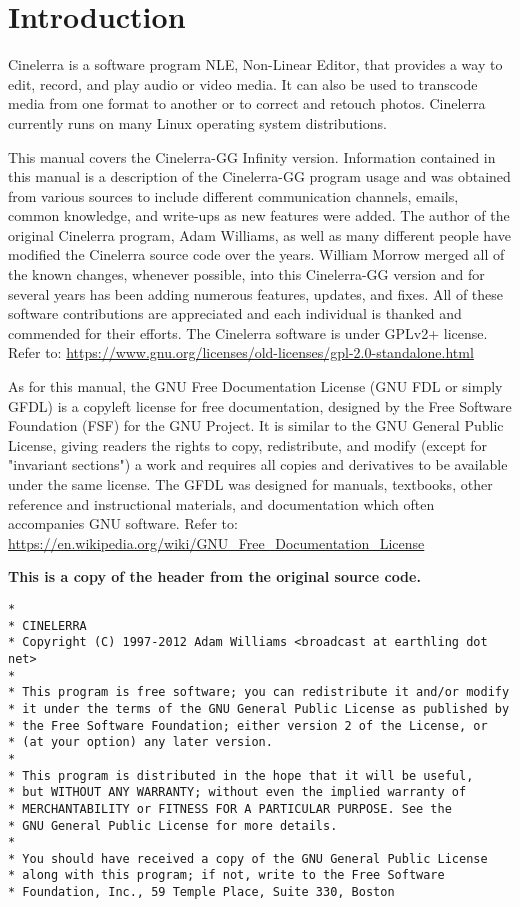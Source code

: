 \chapter*{Introduction}%
\label{cha:introduction}

Cinelerra is a software program NLE, Non-Linear Editor, that provides a way to edit, record, and play audio or video media. 
It can also be used to transcode media from one format to another or to correct and retouch photos. Cinelerra 
currently runs on many Linux operating system distributions.

This manual covers the Cinelerra-GG Infinity version. 
Information contained in this manual is a description of the Cinelerra-GG program usage and was obtained from
various sources to include different communication channels, emails, common knowledge, and write-ups as new features were added.  
The author of the original Cinelerra program, Adam Williams, as well as many different people have modified
 the Cinelerra source code over the years. 
William Morrow merged all of the known changes, whenever possible, into this Cinelerra-GG version and for several years has been adding numerous features, updates, and fixes. 
All of these software contributions are appreciated and each individual is thanked and commended for their efforts.
The Cinelerra software is under GPLv2+ license. 
Refer to: {\small\url{https://www.gnu.org/licenses/old-licenses/gpl-2.0-standalone.html}}

As for this manual, the GNU Free Documentation License (GNU FDL or simply GFDL) is a copyleft
license for free documentation, designed by the Free Software Foundation (FSF) for the GNU
Project. It is similar to the GNU General Public License, giving readers the rights to copy,
redistribute, and modify (except for "invariant sections") a work and requires all copies and derivatives to be available under the same license.
The GFDL was designed for manuals, textbooks, other reference and instructional materials, and documentation which often accompanies GNU software.
Refer to: {\small\url{https://en.wikipedia.org/wiki/GNU_Free_Documentation_License}}

\textbf{This is a copy of the header from the original source code.}
\begin{lstlisting}[numbers=none,basicstyle=\footnotesize]
*
* CINELERRA
* Copyright (C) 1997-2012 Adam Williams <broadcast at earthling dot net>
*
* This program is free software; you can redistribute it and/or modify
* it under the terms of the GNU General Public License as published by
* the Free Software Foundation; either version 2 of the License, or
* (at your option) any later version.
*
* This program is distributed in the hope that it will be useful,
* but WITHOUT ANY WARRANTY; without even the implied warranty of
* MERCHANTABILITY or FITNESS FOR A PARTICULAR PURPOSE. See the
* GNU General Public License for more details.
*
* You should have received a copy of the GNU General Public License
* along with this program; if not, write to the Free Software
* Foundation, Inc., 59 Temple Place, Suite 330, Boston
\end{lstlisting}


